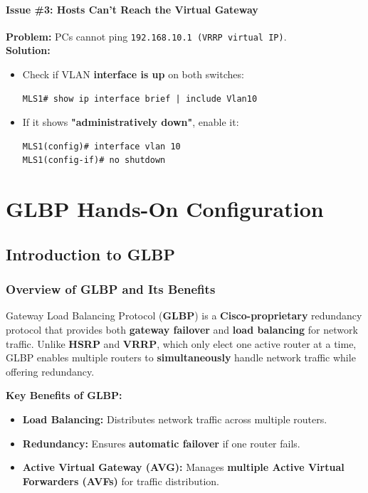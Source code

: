 \documentclass[a4paper]{book}
\begin{document}
\subsubsection{Issue \#3: Hosts Can’t Reach the Virtual Gateway}
\textbf{Problem:} PCs cannot ping \texttt{192.168.10.1 (VRRP virtual IP)}.\\
\textbf{Solution:}
\begin{itemize}
\item Check if VLAN \textbf{interface is up} on both switches:
\begin{lstlisting}
MLS1# show ip interface brief | include Vlan10
\end{lstlisting}
\item If it shows \textbf{"administratively down"}, enable it:
\begin{lstlisting}
MLS1(config)# interface vlan 10
MLS1(config-if)# no shutdown
\end{lstlisting}
\end{itemize}





\chapter{GLBP Hands-On Configuration}


\section{Introduction to GLBP}

\subsection{Overview of GLBP and Its Benefits}
Gateway Load Balancing Protocol (\textbf{GLBP}) is a \textbf{Cisco-proprietary} redundancy 
protocol that provides both \textbf{gateway failover} and \textbf{load balancing} for network 
traffic. Unlike \textbf{HSRP} and \textbf{VRRP}, which only elect one active router at a time, 
GLBP enables multiple routers to \textbf{simultaneously} handle network traffic while offering 
redundancy.

\textbf{Key Benefits of GLBP:}
\begin{itemize}
\item \textbf{Load Balancing:} Distributes network traffic across multiple routers.
\item \textbf{Redundancy:} Ensures \textbf{automatic failover} if one router fails.
\item \textbf{Active Virtual Gateway (AVG):} Manages \textbf{multiple Active Virtual Forwarders (AVFs)} 
for traffic distribution.
\end{itemize}
\end{document}
